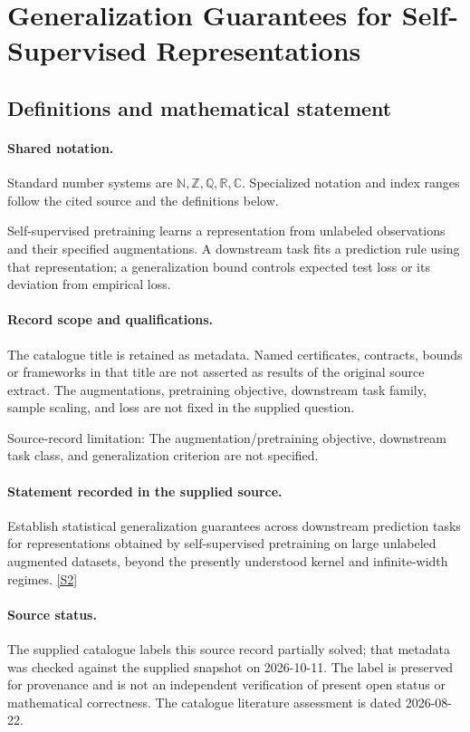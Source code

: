 \documentclass[11pt]{article}
\newcommand{\sref}[2]{\hyperlink{source:#1:#2}{[S#2]}}
\begin{document}
\section{Generalization Guarantees for Self-Supervised Representations}\label{statement}

\subsection{Definitions and mathematical statement}

\paragraph{Shared notation.}Standard number systems are $\mathbb N,\mathbb Z,\mathbb Q,\mathbb R,\mathbb C$. Specialized notation and index ranges follow the cited source and the definitions below.


Self-supervised pretraining learns a representation from unlabeled observations and their specified augmentations. A downstream task fits a prediction rule using that representation; a generalization bound controls expected test loss or its deviation from empirical loss.
\paragraph{Record scope and qualifications.}
The catalogue title is retained as metadata. Named certificates, contracts, bounds or frameworks in that title are not asserted as results of the original source extract.
The augmentations, pretraining objective, downstream task family, sample scaling, and loss are not fixed in the supplied question.

Source-record limitation: The augmentation/pretraining objective, downstream task class, and generalization criterion are not specified.
\paragraph{Statement recorded in the supplied source.}
Establish statistical generalization guarantees across downstream prediction tasks for representations obtained by self-supervised pretraining on large unlabeled augmented datasets, beyond the presently understood kernel and infinite-width regimes. \sref{statement}{2}
\paragraph{Source status.}
The supplied catalogue labels this source record partially solved; that metadata was checked against the supplied snapshot on 2026-10-11. The label is preserved for provenance and is not an independent verification of present open status or mathematical correctness. The catalogue literature assessment is dated 2026-08-22.
\end{document}
